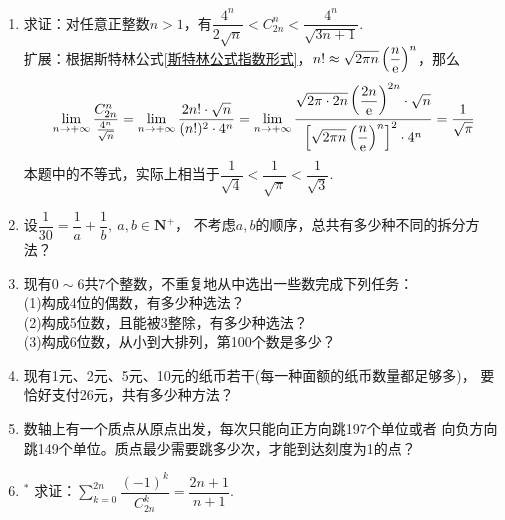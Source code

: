 \begin{enumerate}[label={\textbf{\thechapter.\arabic*}},leftmargin=
    \inteval{\myenumleftmargin}pt]
\item 求证：对任意正整数$ n>1 $，有$ \dfrac{4^n}{2\sqrt{n}}<
C_{2n}^{n} < \dfrac{4^n}{\sqrt{3n+1}} $. \\
扩展：根据斯特林公式\eqref{斯特林公式指数形式}，$n!\approx \sqrt{2\pi n}
\left(\dfrac{n}{\mathrm{e}}\right)^n$，那么
\begin{gather*}
    \lim_{n\to+\infty}\dfrac{C_{2n}^n}{\frac{4^n}{\sqrt{n}}}  = \lim_{n\to+\infty}
    \dfrac{2n!\cdot \sqrt{n}}{(n!)^2\cdot 4^n} 
    = \lim_{n\to+\infty} \dfrac{\sqrt{2\pi \cdot 2n}\left(\dfrac{2n}{\mathrm{e}}
        \right)^{2n}\cdot \sqrt{n}}{\left[\sqrt{2\pi n}
        \left(\dfrac{n}{\mathrm{e}}\right)^n\right]^2 \cdot 4^n} = \dfrac{1}{\sqrt{\pi}}    
\end{gather*}
本题中的不等式，实际上相当于$\dfrac{1}{\sqrt{4}}<\dfrac{1}{\sqrt{\pi}}
<\dfrac{1}{\sqrt{3}}$.

\item 设$ \dfrac{1}{30}=\dfrac{1}{a}+\dfrac{1}{b},\ a,b\in\textbf{N}^+ $，
不考虑$ a,b $的顺序，总共有多少种不同的拆分方法？

\item 现有$ 0\sim 6 $共7个整数，不重复地从中选出一些数完成下列任务：\\
(1)构成4位的偶数，有多少种选法？\\
(2)构成5位数，且能被3整除，有多少种选法？\\
(3)构成6位数，从小到大排列，第100个数是多少？

\item 现有1元、2元、5元、10元的纸币若干(每一种面额的纸币数量都足够多)，
要恰好支付26元，共有多少种方法？ 

\item 数轴上有一个质点从原点出发，每次只能向正方向跳197个单位或者
向负方向跳149个单位。质点最少需要跳多少次，才能到达刻度为1的点？

\item $^*$  求证：$\sum\limits_{k=0}^{2n}
\dfrac{(-1)^k}{C_{2n}^k}=\dfrac{2n+1}{n+1}$.

\end{enumerate}


